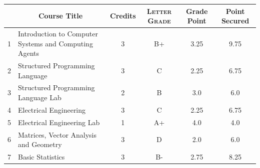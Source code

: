 \documentclass[11pt]{article}
\newcommand*{\numtwo}[1]{\pgfmathprintnumber[
                    fixed, precision=2, fixed zerofill=true]{#1}}
\begin{document}
                \begin{center}
                    \renewcommand{\arraystretch}{1.08}
                    
                \begin{tabular}{|c|l|c|>{\scshape}c|c|c|}
                \hline  \rule[-1ex]{0pt}{3.5ex} {\centering{\bf Course Code}} &  \multicolumn{1}{c|}{\textbf{Course Title}}  & {\bf Credits} & {\bf Letter Grade} & {\bf Grade Point} & {\bf Point Secured}  \\ 
                \hline   1 &  Introduction to Computer Systems and Computing Agents		 & 3 & B+ & 3.25 & 9.75 \\ %
                \hline   2 &  Structured Programming Language		 & 3 & C & 2.25 & 6.75 \\ %
                \hline   3 &  Structured Programming Language Lab		 & 2 & B & 3.0 & 6.0 \\ %
                \hline   4 &  Electrical Engineering		 & 3 & C & 2.25 & 6.75 \\ %
                \hline   5 &  Electrical Engineering Lab		 & 1 & A+ & 4.0 & 4.0 \\ %
                \hline   6 &  Matrices, Vector Analysis and Geometry		 & 3 & D & 2.0 & 6.0 \\ %
                \hline   7 &  Basic Statistics		 & 3 & B- & 2.75 & 8.25 \\ %

\hline                %
                \end{tabular}
                \end{center}
                \renewcommand{\arraystretch}{1.03}
\end{document}
